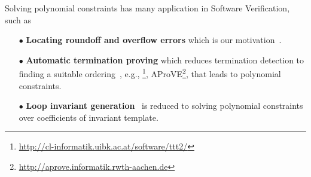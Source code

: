 %
Solving polynomial constraints has many application in Software Verification, such as 
\begin{itemize}
\item[$\bullet$] {\bf Locating roundoff and overflow errors}
which is our motivation~\cite{Ngoc:2009:ORE:1685167.1685421,Ngoc:2010:CRE:1858996.1859056}.

\item[$\bullet$] {\bf Automatic termination proving} 
which reduces termination detection to finding a suitable ordering~\cite{Lucas:2008:CCS:1361735.1361760}, 
e.g., \TTTT\footnote{\url{http://cl-informatik.uibk.ac.at/software/ttt2/}}, 
AProVE\footnote{\url{http://aprove.informatik.rwth-aachen.de}}, that leads to polynomial constraints. 

\item[$\bullet$] {\bf Loop invariant generation}~\cite{Colon,Sankaranarayanan:2004:NLI:982962.964028} is reduced to solving polynomial constraints over coefficients of invariant template. 

\begin{comment}
\item {\bf Hybrid system}. Solving polynomial constraints over real numbers is often used as backend engines~\cite{Sankaranarayanan04constructinginvariants}. 

\item {\bf Mechanical contrnol design}. 
PID control is simple but widely used, and designing parameters is 
reduced to polynomial constraints~\cite{control}. 
\end{comment}
\end{itemize}	


